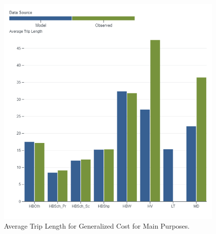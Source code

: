 \documentclass[
  letterpaper,
  DIV=11,
  numbers=noendperiod]{scrreprt}
\begin{document}
\begin{figure}[H]

{\centering \includegraphics[width=\textwidth,height=0.4\textheight]{v9x/v900/validation/_pictures/5-plot1.png}

}

\caption{\label{fig-pdf-gc-purp}Average Trip Length for Generalized Cost
for Main Purposes.}

\end{figure}
\end{document}
